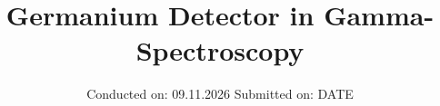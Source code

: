 

\usepackage{tikz}
\usetikzlibrary{arrows.meta,positioning}
\usepackage{pgfplots}
\pgfplotsset{compat=1.18}
\usepackage{xurl}
\usepackage{needspace}

\AtBeginBibliography{\small\raggedright}
\hypersetup{hidelinks}

\subject{EXPERIMENT NUMBER 18}
\title{Germanium Detector in Gamma-Spectroscopy}
\date{%
  Conducted on: 09.11.2026
  \hspace{3em}
  Submitted on: DATE
}



\maketitle
\thispagestyle{empty}
\tableofcontents
\newpage
{}







\printbibliography{}


